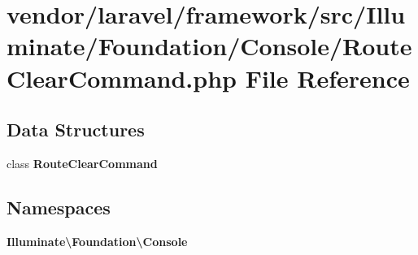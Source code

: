 \section{vendor/laravel/framework/src/\+Illuminate/\+Foundation/\+Console/\+Route\+Clear\+Command.php File Reference}
\label{_route_clear_command_8php}
\subsection*{Data Structures}
\begin{DoxyCompactItemize}
\item 
class {\bf Route\+Clear\+Command}
\end{DoxyCompactItemize}
\subsection*{Namespaces}
\begin{DoxyCompactItemize}
\item 
 {\bf Illuminate\textbackslash{}\+Foundation\textbackslash{}\+Console}
\end{DoxyCompactItemize}
